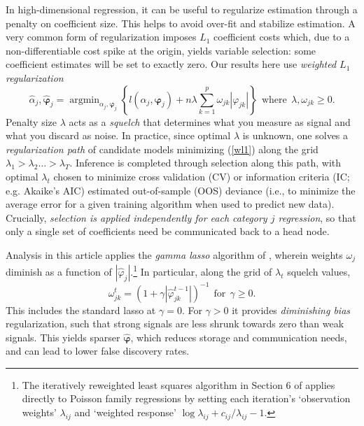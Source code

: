 \documentclass[12pt]{article}
\newcommand{\bs}[1]{\boldsymbol{#1}}
\DeclareMathOperator*{\argmin}{argmin}
\begin{document}
In high-dimensional regression, it can be useful to regularize estimation
through a penalty on coefficient size.   This helps  to avoid over-fit and
stabilize estimation.
A very common form of regularization imposes $L_1$ coefficient costs
\citep[i.e., the lasso of][]{tibshirani_regression_1996} which, due to
a non-differentiable cost spike at the origin, yields variable selection: some
coefficient estimates will be set to exactly zero.  Our results here use {\it
weighted $L_1$ regularization}
\begin{equation}\label{wl1}
 \hat\alpha_j,\bs{\hat\varphi}_j = \argmin_{\alpha_j,\bs{\varphi}_j} \left\{l(\alpha_j,\bs{\varphi}_j) + n \lambda \sum_{k=1}^p \omega_{jk} |\varphi_{jk} |\right\} ~~\text{where}~~\lambda,\omega_{jk} \geq 0.
\end{equation}
Penalty size $\lambda$ acts as a {\it squelch} that determines what you
measure as signal and what you discard as noise. In practice, since optimal
$\lambda$ is unknown, one solves a {\it regularization path} of candidate
models minimizing (\ref{wl1}) along the grid $\lambda_1 >
\lambda_2 \ldots > \lambda_T$.  Inference is completed through selection
along this path, with optimal $\lambda_t$ chosen to minimize cross validation
(CV) or information criteria (IC; e.g. Akaike's AIC) estimated
out-of-sample (OOS) deviance (i.e., to minimize the average error for a given
training algorithm when used to predict new data).  Crucially,  {\it selection is
applied independently for each category $j$ regression}, so that only a single
set of coefficients need be communicated back to a head node. 

Analysis in this article applies the {\it gamma lasso} algorithm  of
\citet{taddy_gamma_2013}, wherein weights $\omega_j$ diminish as a
function of $|\hat\varphi_j|$.\footnote{The iteratively reweighted least
squares algorithm in Section 6 of \citet{taddy_gamma_2013} applies directly to Poisson
family regressions by setting each iteration's `observation weights' $\lambda_{ij}$ and
`weighted response' $\log\lambda_{ij} + c_{ij}/\lambda_{ij} - 1$.}  In particular,
along the grid of $\lambda_t$ squelch values,
\begin{equation}\label{glweight}
\omega^{t}_{jk}  = \left(1 + \gamma
|\hat\varphi^{t-1}_{jk}|\right)^{-1} ~~\text{for}~~\gamma \geq 0.
\end{equation} 
This includes the standard lasso at $\gamma=0$.  For $\gamma>0$ it provides
{\it diminishing bias} regularization, such that strong signals are less
shrunk towards zero than  weak signals. This yields
sparser $\bs{\hat
\varphi}$, which reduces storage and communication needs, and can
 lead to lower false discovery rates.  
\end{document}
